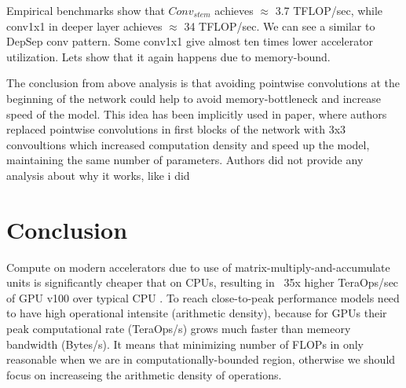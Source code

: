 %

Empirical benchmarks show that $Conv_{stem}$ achieves $\approx$ 3.7 TFLOP/sec, while conv1x1 in deeper layer achieves $\approx$ 34 TFLOP/sec. We can see a similar to DepSep conv pattern. Some conv1x1 give almost ten times lower accelerator utilization. Lets show that it again happens due to memory-bound.



The conclusion from above analysis is that avoiding pointwise convolutions at the beginning of the network could help to avoid memory-bottleneck and increase speed of the model. This idea has been implicitly used in \cite{ridnik2021_tresnet} paper, where authors replaced pointwise convolutions in first blocks of the network with 3x3 convoultions which increased computation density and speed up the model, maintaining the same number of parameters. Authors did not provide any analysis about why it works, like i did  



\section{Conclusion} \label{subsec: speed_conclusion}

Compute on modern accelerators due to use of matrix-multiply-and-accumulate units is significantly cheaper that on CPUs, resulting in ~35x higher TeraOps/sec of GPU v100 over typical CPU \cite{li2021_searching}. To reach close-to-peak performance models need to have high operational intensite (arithmetic density), because for GPUs their peak computational rate (TeraOps/s) grows much faster than memeory bandwidth (Bytes/s). It means that minimizing number of FLOPs in only reasonable when we are in computationally-bounded region, otherwise we should focus on increaseing the arithmetic density of operations.  



